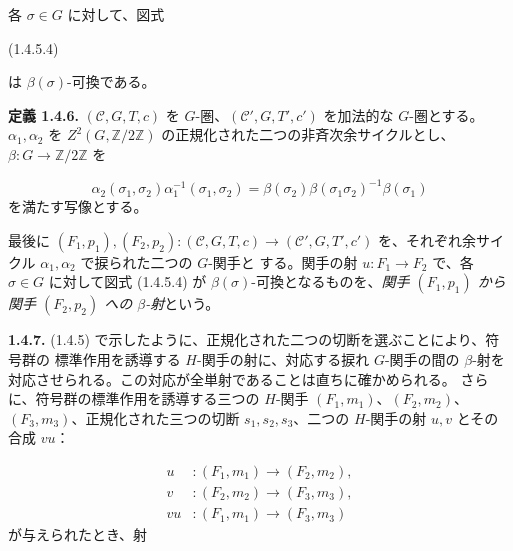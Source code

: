 \clearpage
{}%
各 $\sigma\in G$ に対して、図式

\begin{center}
  \hfill\textup{(1.4.5.4)}
\end{center}
は $\beta(\sigma)$-可換である。

\noindent\textbf{定義 1.4.6.}\quad
$(\mathcal C,G,T,c)$ を $G$-圏、$(\mathcal C',G,T',c')$ を加法的な
$G$-圏とする。$\alpha_1,\alpha_2$ を
$Z^2(G,\mathbb Z/2\mathbb Z)$ の正規化された二つの非斉次余サイクルとし、
$\beta\colon G\to\mathbb Z/2\mathbb Z$ を

\begin{equation}
  \alpha_2(\sigma_1,\sigma_2)\alpha_1^{-1}(\sigma_1,\sigma_2)
  =\beta(\sigma_2)\beta(\sigma_1\sigma_2)^{-1}\beta(\sigma_1)
  \tag{1.4.6.1}
\end{equation}
を満たす写像とする。

最後に
$(F_1,p_1),(F_2,p_2)\colon(\mathcal C,G,T,c)
\to(\mathcal C',G,T',c')$
を、それぞれ余サイクル $\alpha_1,\alpha_2$ で捩られた二つの $G$-関手と
する。関手の射 $u\colon F_1\to F_2$ で、各 $\sigma\in G$ に対して図式
(1.4.5.4) が $\beta(\sigma)$-可換となるものを、\emph{関手 $(F_1,p_1)$ から
関手 $(F_2,p_2)$ への $\beta$-射}という。

\noindent\textbf{1.4.7.}\quad
(1.4.5) で示したように、正規化された二つの切断を選ぶことにより、符号群の
標準作用を誘導する $H$-関手の射に、対応する捩れ $G$-関手の間の
$\beta$-射を対応させられる。この対応が全単射であることは直ちに確かめられる。
さらに、符号群の標準作用を誘導する三つの $H$-関手
$(F_1,m_1)$、$(F_2,m_2)$、$(F_3,m_3)$、正規化された三つの切断
$s_1,s_2,s_3$、二つの $H$-関手の射 $u,v$ とその合成 $vu$：

\begin{equation}
  \begin{aligned}
    u&\colon(F_1,m_1)\longrightarrow(F_2,m_2),\\
    v&\colon(F_2,m_2)\longrightarrow(F_3,m_3),\\
    vu&\colon(F_1,m_1)\longrightarrow(F_3,m_3)
  \end{aligned}
  \tag{1.4.7.1}
\end{equation}
が与えられたとき、射

